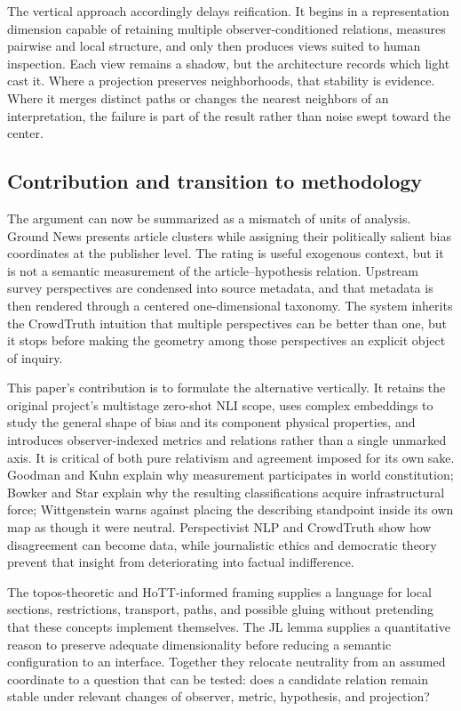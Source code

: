 The vertical approach accordingly delays reification. It begins in a representation dimension capable of retaining multiple observer-conditioned relations, measures pairwise and local structure, and only then produces views suited to human inspection. Each view remains a shadow, but the architecture records which light cast it. Where a projection preserves neighborhoods, that stability is evidence. Where it merges distinct paths or changes the nearest neighbors of an interpretation, the failure is part of the result rather than noise swept toward the center.

\subsection{Contribution and transition to methodology}

The argument can now be summarized as a mismatch of units of analysis. Ground News presents article clusters while assigning their politically salient bias coordinates at the publisher level. The rating is useful exogenous context, but it is not a semantic measurement of the article--hypothesis relation. Upstream survey perspectives are condensed into source metadata, and that metadata is then rendered through a centered one-dimensional taxonomy. The system inherits the CrowdTruth intuition that multiple perspectives can be better than one, but it stops before making the geometry among those perspectives an explicit object of inquiry.

This paper's contribution is to formulate the alternative vertically. It retains the original project's multistage zero-shot NLI scope, uses complex embeddings to study the general shape of bias and its component physical properties, and introduces observer-indexed metrics and relations rather than a single unmarked axis. It is critical of both pure relativism and agreement imposed for its own sake. Goodman and Kuhn explain why measurement participates in world constitution; Bowker and Star explain why the resulting classifications acquire infrastructural force; Wittgenstein warns against placing the describing standpoint inside its own map as though it were neutral. Perspectivist NLP and CrowdTruth show how disagreement can become data, while journalistic ethics and democratic theory prevent that insight from deteriorating into factual indifference.

The topos-theoretic and HoTT-informed framing supplies a language for local sections, restrictions, transport, paths, and possible gluing without pretending that these concepts implement themselves. The JL lemma supplies a quantitative reason to preserve adequate dimensionality before reducing a semantic configuration to an interface. Together they relocate neutrality from an assumed coordinate to a question that can be tested: does a candidate relation remain stable under relevant changes of observer, metric, hypothesis, and projection?


